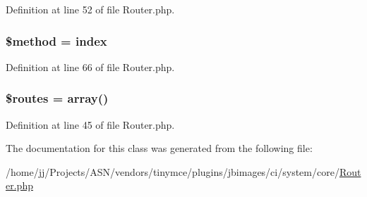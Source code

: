 Definition at line 52 of file Router.\+php.

\subsubsection[{\texorpdfstring{\$method}{$method}}]{\setlength{\rightskip}{0pt plus 5cm}\$method = \textquotesingle{}index\textquotesingle{}}\hypertarget{class_c_i___router_a12661b2fc0f57f97e30a1620889ce9c6}{}\label{class_c_i___router_a12661b2fc0f57f97e30a1620889ce9c6}


Definition at line 66 of file Router.\+php.

\subsubsection[{\texorpdfstring{\$routes}{$routes}}]{\setlength{\rightskip}{0pt plus 5cm}\$routes = array()}\hypertarget{class_c_i___router_a8f7eb04a54e0f0bfc0cedeb9899ce4a8}{}\label{class_c_i___router_a8f7eb04a54e0f0bfc0cedeb9899ce4a8}


Definition at line 45 of file Router.\+php.



The documentation for this class was generated from the following file\+:\begin{DoxyCompactItemize}
\item 
/home/jj/\+Projects/\+A\+S\+N/vendors/tinymce/plugins/jbimages/ci/system/core/\hyperlink{_router_8php}{Router.\+php}\end{DoxyCompactItemize}
